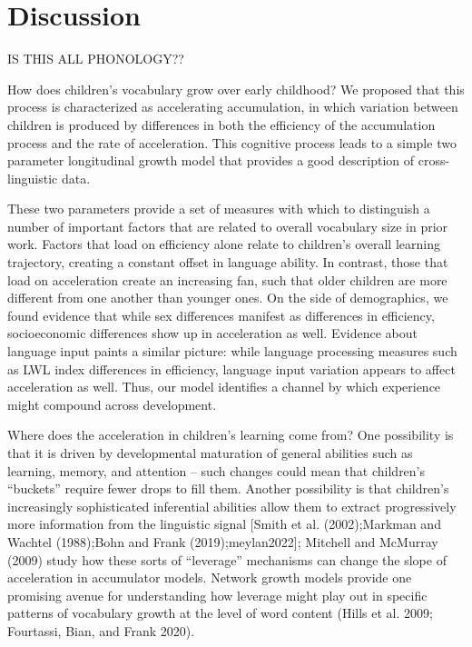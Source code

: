 \documentclass[
  11pt,
]{article}
\begin{document}
\section{Discussion}\label{discussion}

IS THIS ALL PHONOLOGY??

How does children's vocabulary grow over early childhood? We proposed
that this process is characterized as accelerating accumulation, in
which variation between children is produced by differences in both the
efficiency of the accumulation process and the rate of acceleration.
This cognitive process leads to a simple two parameter longitudinal
growth model that provides a good description of cross-linguistic data.

These two parameters provide a set of measures with which to distinguish
a number of important factors that are related to overall vocabulary
size in prior work. Factors that load on efficiency alone relate to
children's overall learning trajectory, creating a constant offset in
language ability. In contrast, those that load on acceleration create an
increasing fan, such that older children are more different from one
another than younger ones. On the side of demographics, we found
evidence that while sex differences manifest as differences in
efficiency, socioeconomic differences show up in acceleration as well.
Evidence about language input paints a similar picture: while language
processing measures such as LWL index differences in efficiency,
language input variation appears to affect acceleration as well. Thus,
our model identifies a channel by which experience might compound across
development.

Where does the acceleration in children's learning come from? One
possibility is that it is driven by developmental maturation of general
abilities such as learning, memory, and attention -- such changes could
mean that children's ``buckets'' require fewer drops to fill them.
Another possibility is that children's increasingly sophisticated
inferential abilities allow them to extract progressively more
information from the linguistic signal {[}Smith et al. (2002);Markman
and Wachtel (1988);Bohn and Frank (2019);meylan2022{]}; Mitchell and
McMurray (2009) study how these sorts of ``leverage'' mechanisms can
change the slope of acceleration in accumulator models. Network growth
models provide one promising avenue for understanding how leverage might
play out in specific patterns of vocabulary growth at the level of word
content (Hills et al. 2009; Fourtassi, Bian, and Frank 2020).
\end{document}
